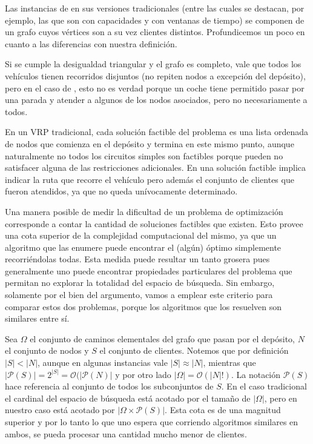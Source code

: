 Las instancias de  en sus versiones tradicionales (entre las cuales se destacan, por ejemplo, las que son con capacidades y con ventanas de tiempo) se componen de un grafo cuyos vértices son a su vez clientes distintos. Profundicemos un poco en cuanto a las diferencias con nuestra definición.

Si se cumple la desigualdad triangular y el grafo es completo, vale que todos los vehículos tienen recorridos disjuntos (no repiten nodos a excepción del depósito), pero en el caso de , esto no es verdad porque un coche tiene permitido pasar por una parada y atender a algunos de los nodos asociados, pero no necesariamente a todos. 

En un VRP tradicional, cada solución factible del problema es una lista ordenada de nodos que comienza en el depósito y termina en este mismo punto, aunque naturalmente no todos los circuitos simples son factibles porque pueden no satisfacer alguna de las restricciones adicionales. En  una solución factible implica indicar la ruta que recorre el vehículo pero además el conjunto de clientes que fueron atendidos, ya que no queda unívocamente determinado. 

Una manera posible de medir la dificultad de un problema de optimización corresponde a contar la cantidad de soluciones factibles que existen. Esto provee una cota superior de la complejidad computacional del mismo, ya que un algoritmo que las enumere puede encontrar el (algún) óptimo simplemente recorriéndolas todas. Esta medida puede resultar un tanto grosera pues generalmente uno puede encontrar propiedades particulares del problema que permitan no explorar la totalidad del espacio de búsqueda. Sin embargo, solamente por el bien del argumento, vamos a emplear este criterio para comparar estos dos problemas, porque los algoritmos que los resuelven son similares entre sí.

Sea $\Omega$ el conjunto de caminos elementales del grafo que pasan por el depósito, $N$ el conjunto de nodos y $S$ el conjunto de clientes. Notemos que por definición $|S| < |N|$, aunque en algunas instancias vale $|S| \approx |N|$, mientras que $|\mathscr{P}(S)| = 2^{|S|} = \mathcal{O}(|\mathscr{P}(N)|$ y por otro lado $|\Omega| = \mathcal{O}(|N|!)$. La notación $\mathscr{P}(S)$ hace referencia al conjunto de todos los subconjuntos de $S$. En el caso tradicional el cardinal del espacio de búsqueda está acotado por el tamaño de $|\Omega|$, pero en nuestro caso está acotado por $|\Omega \times \mathscr{P}(S)|$. Esta cota es de una magnitud superior y por lo tanto lo que uno espera que corriendo algoritmos similares en ambos, se pueda procesar una cantidad mucho menor de clientes.  


